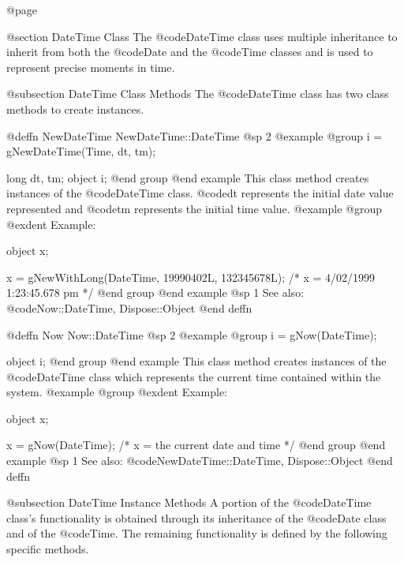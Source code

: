 @page

@section DateTime Class
The @code{DateTime} class uses multiple inheritance to inherit
from both the @code{Date} and the @code{Time} classes and is
used to represent precise moments in time.





@subsection DateTime Class Methods
The @code{DateTime} class has two class methods to create instances.






@deffn {NewDateTime} NewDateTime::DateTime
@sp 2
@example
@group
i = gNewDateTime(Time, dt, tm);

long    dt, tm;
object  i;
@end group
@end example
This class method creates instances of the @code{DateTime} class.  @code{dt}
represents the initial date value represented and @code{tm} represents
the initial time value.
@example
@group
@exdent Example:

object  x;

x = gNewWithLong(DateTime, 19990402L, 132345678L);
/*  x = 4/02/1999 1:23:45.678 pm  */
@end group
@end example
@sp 1
See also:  @code{Now::DateTime, Dispose::Object}
@end deffn










@deffn {Now} Now::DateTime
@sp 2
@example
@group
i = gNow(DateTime);

object  i;
@end group
@end example
This class method creates instances of the @code{DateTime} class which
represents the current time contained within the system.
@example
@group
@exdent Example:

object  x;

x = gNow(DateTime);   /*  x = the current date and time  */
@end group
@end example
@sp 1
See also:  @code{NewDateTime::DateTime, Dispose::Object}
@end deffn










@subsection DateTime Instance Methods
A portion of the @code{DateTime} class's functionality is obtained through
its inheritance of the @code{Date} class and of the @code{Time}.  The
remaining functionality is defined by the following specific methods.







